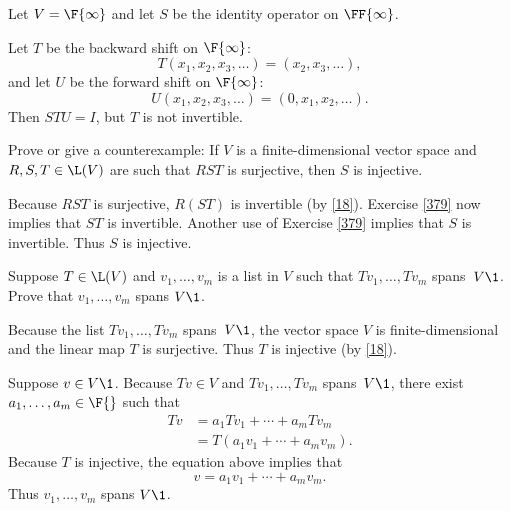 \begin{Solution}
Let $V = \F{\infty}$ and let $S$ be the identity operator on $\FF{\infty}$.

Let $T$ be the backward shift on $\F{\infty}$:
\[
T(x_1, x_2, x_3, \dotsc) = (x_2, x_3, \dotsc),
\]
and let $U$ be the forward shift on $\F{\infty}$:
\[
U(x_1, x_2, x_3, \dotsc) = (0, x_1, x_2, \dotsc).
\]
Then $STU = I$, but $T$ is not invertible.
\end{Solution}

\exercise
Prove or give a counterexample: If $V$ is a finite-dimensional vector space and $R, S, T \in
\L(V)$ are such that $RST$ is surjective, then $S$ is  injective.

\begin{Solution}
Because $RST$ is surjective, $R(ST)$ is invertible (by \ref{18}). Exercise \ref{379} now implies that $ST$ is invertible. Another use of Exercise \ref{379} implies that $S$ is invertible. Thus $S$ is injective.
\end{Solution}

\exercise
Suppose $T \in \L(V)$ and $v_1, \dots, v_m$ is a list in $V$ such that $Tv_1, \dots, Tv_m$ spans~$V\1$. Prove that
$v_1, \dots, v_m$ spans $V\1$.

\begin{Solution}
Because the list $Tv_1, \dots, Tv_m$ spans~$V\1$, the vector space $V$ is finite-dimensional and the linear map $T$ is surjective. Thus $T$ is injective (by \ref{18}).

Suppose $v \in V\1$. Because $Tv \in V$ and $Tv_1, \dots, Tv_m$ spans~$V\1$, there exist $a_1, \ldots, a_m \in \F{}$ such that
\begin{align*}
Tv &= a_1 Tv_1 + \cdots + a_m Tv_m \\[3bp]
&= T( a_1 v_1 + \cdots + a_m v_m ).
\end{align*}
Because $T$ is injective, the equation above implies that
\[
v = a_1 v_1 + \cdots + a_m v_m.
\]
Thus $v_1, \dots, v_m$ spans $V\1$.
\end{Solution}

